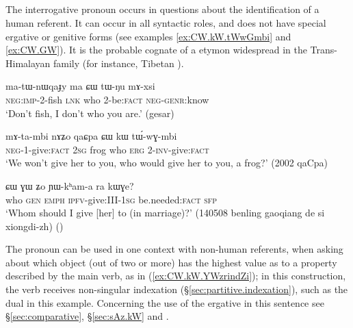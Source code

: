 \subsection{} \label{sec:CW.pronoun}
The interrogative pronoun  occurs in questions about the identification of a human referent. It can occur in all syntactic roles, and does not have special ergative or genitive forms (see examples \ref{ex:CW.kW.tWwGmbi} and \ref{ex:CW.GW}). It is the probable cognate of a etymon widespread in the Trans-Himalayan family (for instance, Tibetan ).

\begin{exe}
\ex  \label{ex:CW.tWNu}
\gll ma-tɯ-nɯqaɟy ma ɕɯ tɯ-ŋu mɤ-xsi \\
\textsc{neg}:\textsc{imp}-2-fish \textsc{lnk} who 2-be:\textsc{fact} \textsc{neg}-\textsc{genr}:know   \\
\glt `Don't fish, I don't who you are.' (gesar)
\end{exe}  

\begin{exe}
\ex  \label{ex:CW.kW.tWwGmbi}
\gll  mɤ-ta-mbi nɤʑo qaɕpa ɕɯ kɯ tɯ́-wɣ-mbi    \\
\textsc{neg}-1-give:\textsc{fact} \textsc{2sg} frog who \textsc{erg} 2-\textsc{inv}-give:\textsc{fact}  \\
\glt `We won't give her to you, who would give her to you, a frog?'   (2002 qaCpa)
\end{exe} 
 
\begin{exe}
\ex  \label{ex:CW.GW}
\gll  ɕɯ ɣɯ ʑo ɲɯ-kʰam-a ra kɯɣe?    \\
who \textsc{gen} \textsc{emph} \textsc{ipfv}-give:III-\textsc{1sg} be.needed:\textsc{fact} \textsc{sfp} \\
\glt `Whom should I give [her] to (in marriage)?' (140508 benling gaoqiang de si xiongdi-zh) ()
\end{exe}  

The pronoun   can be used in one context with non-human referents, when asking about which object (out of two or more) has the highest value as to a property described by the main verb, as in (\ref{ex:CW.kW.YWzrindZi}); in this construction, the verb receives non-singular indexation (§\ref{sec:partitive.indexation}), such as the dual   in this example. Concerning the use of the ergative  in this sentence see §\ref{sec:comparative}, §\ref{sec:sAz.kW} and \citet{jacques16comparative}.  

